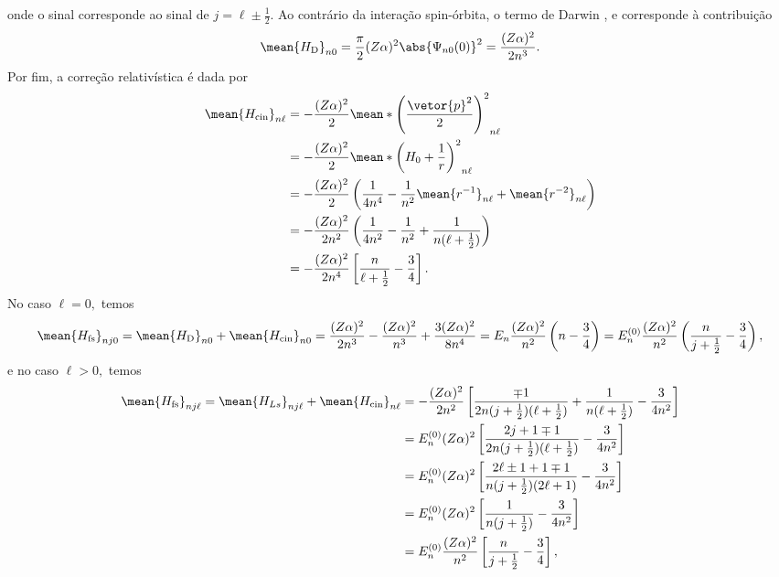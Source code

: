 onde o sinal corresponde ao sinal de \(j = \ell \pm \frac12.\) Ao contrário da interação spin-órbita, o termo de Darwin \todo[só é não nulo para \(\ell = 0\)], e corresponde à contribuição
\begin{equation*}
   \mean{H_\mathrm{D}}_{n0} = \frac{\pi}{2}(Z \alpha)^2 \abs{\Psi_{n0}(0)}^2 = \frac{(Z \alpha)^2}{2n^3}.
\end{equation*}
Por fim, a correção relativística é dada por
\begin{align*}
   \mean{H_\mathrm{cin}}_{n\ell} &= -\frac{(Z\alpha)^2}{2}\mean*{\left(\frac{\vetor{p}^2}{2}\right)^2}_{n\ell}\\
                                 &= - \frac{(Z \alpha)^2}{2} \mean*{\left(H_0 + \frac{1}{r}\right)^2}_{n\ell}\\
                                 &= -\frac{(Z \alpha)^2}{2} \left(\frac{1}{4n^4} - \frac{1}{n^2}\mean{r^{-1}}_{n\ell} + \mean{r^{-2}}_{n\ell}\right)\\
                                 &= - \frac{(Z \alpha)^2}{2n^2} \left(\frac{1}{4n^2} - \frac{1}{n^2} + \frac{1}{n ( \ell + \frac12)}\right)\\
                                 &= -\frac{(Z \alpha)^2}{2n^4}\left[\frac{n}{\ell + \frac12} - \frac34\right].
\end{align*}
No caso \(\ell = 0,\) temos
\begin{equation*}
   \mean{H_\mathrm{fs}}_{nj0} = \mean{H_\mathrm{D}}_{n 0} + \mean{H_\mathrm{cin}}_{n 0} = \frac{(Z \alpha)^2}{2n^3} - \frac{(Z \alpha)^2}{n^3} + \frac{3(Z \alpha)^2}{8n^4} = E_n\frac{(Z \alpha)^2}{n^2}\left(n - \frac34\right) = E_n^{(0)} \frac{(Z \alpha)^2}{n^2} \left(\frac{n}{j + \frac12} - \frac34\right),
\end{equation*}
e no caso \(\ell > 0,\) temos
\begin{align*}
   \mean{H_\mathrm{fs}}_{nj \ell} = \mean{H_{Ls}}_{nj \ell} + \mean{H_\mathrm{cin}}_{n\ell} 
   &= -\frac{(Z \alpha)^2}{2n^2}\left[\frac{\mp1}{2n (j+\frac12) (\ell + \frac12)} + \frac{1}{n(\ell + \frac12)} - \frac3{4n^2}\right] \\
   &= E_n^{(0)} (Z \alpha)^2\left[\frac{2j + 1 \mp 1}{2n(j + \frac12)(\ell + \frac12)} - \frac3{4n^2}\right]\\
   &= E_n^{(0)} (Z \alpha)^2\left[\frac{2\ell \pm 1 + 1 \mp 1}{n(j + \frac12)(2\ell + 1)} - \frac3{4n^2}\right]\\
   &= E_n^{(0)} (Z \alpha)^2\left[\frac{1}{n(j + \frac12)} - \frac3{4n^2}\right]\\
   &= E_n^{(0)} \frac{(Z \alpha)^2}{n^2}\left[\frac{n}{j + \frac12} - \frac34\right],
\end{align*}
